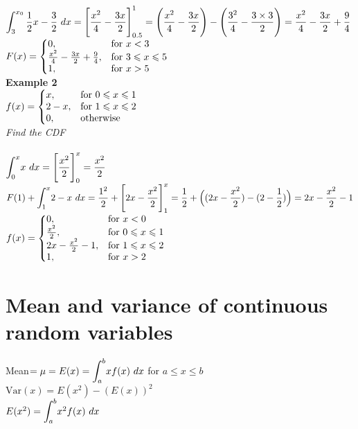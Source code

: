 \documentclass{article}[18pt]
\begin{document}
$\mathlarger{\int_{3}^{x_0} \frac{1}{2}x-\frac{3}{2} \ dx= \Bigg[\dfrac{x^2}{4}-\dfrac{3x}{2}\Bigg]^1_{0.5}}=
\Bigg(\dfrac{x^2}{4}-\dfrac{3x}{2}\Bigg)-\Bigg(\dfrac{3^2}{4}-\dfrac{3\times 3}{2}\Bigg)=\dfrac{x^2}{4}-\dfrac{3x}{2}+\dfrac{9}{4}$\\
$
  F(x)=\left\{
  \begin{array}{@{}ll@{}}
  	0, & \text{for}\ x<3\\
    \frac{x^2}{4}-\frac{3x}{2}+\frac{9}{4}, & \text{for}\ 3\leqslant x \leqslant 5\\
    1, & \text{for}\ x>5
  \end{array}\right.
$\\
\newpage
\textbf{Example 2}\\
$
  f(x)=\left\{
  \begin{array}{@{}ll@{}}
    x, & \text{for}\ 0\leqslant x \leqslant 1\\
    2-x, & \text{for}\ 1\leqslant x \leqslant 2\\
    0, & \text{otherwise}
  \end{array}\right.
$\\
\textit{Find the CDF}\\
\\
$\mathlarger{\int_{0}^{x}} x\ dx = \Bigg[\dfrac{x^2}{2}\Bigg]^x_0=\dfrac{x^2}{2}$\\
$F(1)+\mathlarger{\int_{1}^{x}} 2-x\ dx =\dfrac{1^2}{2}+ \Bigg[2x-\dfrac{x^2}{2}\Bigg]^x_1=\dfrac{1}{2}+\Big((2x-\dfrac{x^2}{2})-(2-\dfrac{1}{2})\Big)=2x-\dfrac{x^2}{2}-1$\\
$
  f(x)=\left\{
  \begin{array}{@{}ll@{}}
    0, & \text{for}\ x<0\\
    \frac{x^2}{2}, & \text{for}\ 0\leqslant x \leqslant 1\\
    2x-\frac{x^2}{2}-1, & \text{for}\ 1\leqslant x \leqslant 2\\
    1, & \text{for}\ x>2
  \end{array}\right.
$\\
\section{Mean and variance of continuous random variables}
Mean$=\mu=E(x)=\mathlarger{\int_{a}^{b}}xf(x)\ dx$ for $a\leqslant x\leqslant b$\\
$\text{Var}(x)=E(x^2)-(E(x))^2$\\
$E(x^2)=\mathlarger{\int_{a}^{b}}x^2f(x)\ dx$
\end{document}
